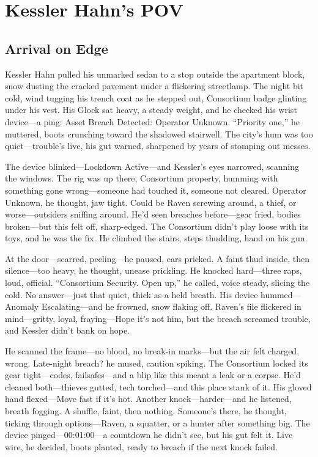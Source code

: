 \documentclass[12pt]{book}
\begin{document}
\chapter{Kessler Hahn’s POV}

\section{Arrival on Edge}

Kessler Hahn pulled his unmarked sedan to a stop outside the apartment block, snow dusting the cracked pavement under a flickering streetlamp. The night bit cold, wind tugging his trench coat as he stepped out, Consortium badge glinting under his vest. His Glock sat heavy, a steady weight, and he checked his wrist device—a ping: Asset Breach Detected: Operator Unknown. “Priority one,” he muttered, boots crunching toward the shadowed stairwell. The city’s hum was too quiet—trouble’s live, his gut warned, sharpened by years of stomping out messes.

The device blinked—Lockdown Active—and Kessler’s eyes narrowed, scanning the windows. The rig was up there, Consortium property, humming with something gone wrong—someone had touched it, someone not cleared. Operator Unknown, he thought, jaw tight. Could be Raven screwing around, a thief, or worse—outsiders sniffing around. He’d seen breaches before—gear fried, bodies broken—but this felt off, sharp-edged. The Consortium didn’t play loose with its toys, and he was the fix. He climbed the stairs, steps thudding, hand on his gun.

At the door—scarred, peeling—he paused, ears pricked. A faint thud inside, then silence—too heavy, he thought, unease prickling. He knocked hard—three raps, loud, official. “Consortium Security. Open up,” he called, voice steady, slicing the cold. No answer—just that quiet, thick as a held breath. His device hummed—Anomaly Escalating—and he frowned, snow flaking off. Raven’s file flickered in mind—gritty, loyal, fraying—Hope it’s not him, but the breach screamed trouble, and Kessler didn’t bank on hope.

He scanned the frame—no blood, no break-in marks—but the air felt charged, wrong. Late-night breach? he mused, caution spiking. The Consortium locked its gear tight—codes, failsafes—and a blip like this meant a leak or a corpse. He’d cleaned both—thieves gutted, tech torched—and this place stank of it. His gloved hand flexed—Move fast if it’s hot. Another knock—harder—and he listened, breath fogging. A shuffle, faint, then nothing. Someone’s there, he thought, ticking through options—Raven, a squatter, or a hunter after something big. The device pinged—00:01:00—a countdown he didn’t see, but his gut felt it. Live wire, he decided, boots planted, ready to breach if the next knock failed.
\end{document}
